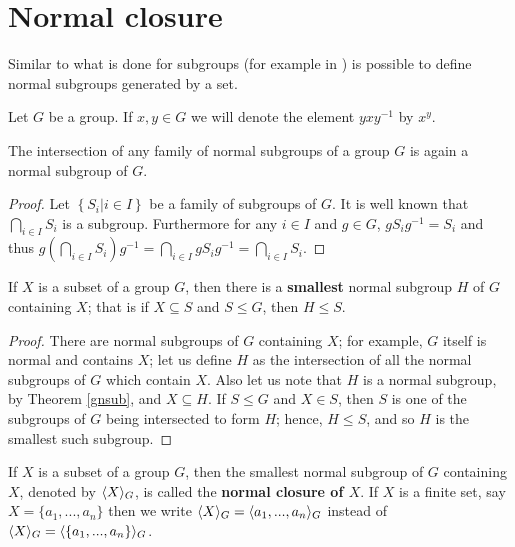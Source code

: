 \section{Normal closure}

Similar to what is done for subgroups (for example in \cite{RotmanITG}) is possible to define normal subgroups generated by a set.

\begin{definition}
    Let $G$ be a group. If $x,y \in G$ we will denote the element $yxy^{-1}$ by $x^{y}$.
\end{definition}

\begin{theorem}
    \label{gnsub}
    The intersection of any family of normal subgroups of a group $G$ is again a normal subgroup of $G$.
\end{theorem}

\begin{proof}
    Let $\left\{ S_i |i \in I \right\}$ be a family of subgroups of $G$. It is well known that $\bigcap_{i \in I} S_i$ is a subgroup. Furthermore for any $i \in I$ and $g \in G$, $gS_ig^{-1} = S_i$ and thus $g(\bigcap_{i \in I} S_i)g^{-1} = \bigcap_{i \in I} gS_ig^{-1} = \bigcap_{i \in I} S_i$.  
\end{proof}

\begin{theorem}
    If $X$ is a subset of a group $G$, then there is a \textbf{smallest} normal subgroup $H$ of $G$ containing $X$; that is if $X \subseteq S$ and $S \le G$, then $H \le S$.   
\end{theorem}

\begin{proof}
    There are normal subgroups of $G$ containing $X$; for example, $G$ itself is normal and contains $X$; let us define $H$ as the intersection of all the normal subgroups of $G$ which contain $X$. Also let us note that $H$ is a normal subgroup, by Theorem \ref{gnsub}, and $X \subseteq H$. If $S \le G$ and $X \in S$, then $S$ is one of the subgroups of $G$ being intersected to form $H$; hence, $H \le S$, and so $H$ is the smallest such subgroup.
\end{proof}

\begin{definition}
    If $X$ is a subset of a group $G$, then the smallest normal subgroup of $G$ containing $X$, denoted by $\langle X \rangle_G$, is called the \textbf{normal closure of $X$}. If $X$ is a finite set, say $X = \{a_1, ..., a_n \}$ then we write $\langle X \rangle_G = \langle a_1, ..., a_n \rangle_G$ instead of $\langle X \rangle_G = \langle \left\{a_1, ..., a_n\right\} \rangle_G$.
\end{definition}

